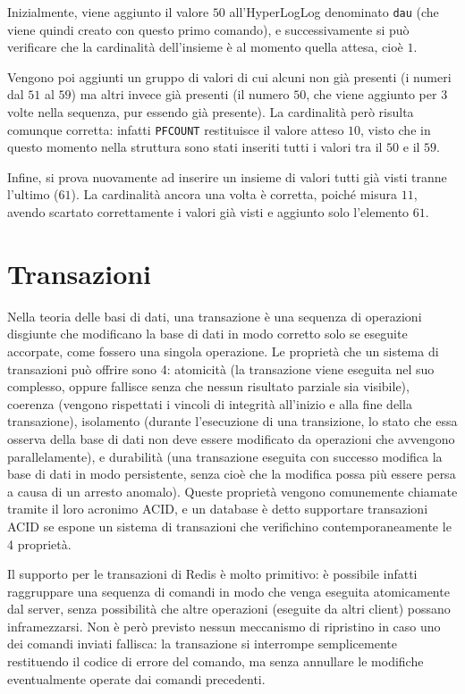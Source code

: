 Inizialmente, viene aggiunto il valore $50$ all'HyperLogLog denominato \verb|dau|  (che
viene quindi creato con questo primo comando), e successivamente si può verificare che la
cardinalità dell'insieme è al momento quella attesa, cioè $1$.

Vengono poi aggiunti un gruppo di valori  di cui alcuni non già presenti (i numeri dal $51$
al $59$) ma altri invece già presenti (il numero $50$, che viene aggiunto per 3 volte nella
sequenza, pur essendo già presente). La cardinalità però risulta comunque corretta: infatti
\verb|PFCOUNT| restituisce il valore atteso $10$, visto che in questo momento nella struttura sono
stati inseriti tutti i valori tra il $50$ e il $59$. 

Infine, si prova nuovamente ad inserire un insieme di valori  tutti già visti tranne
l'ultimo ($61$). La cardinalità ancora una volta è corretta, poiché misura $11$, avendo scartato
correttamente i valori già visti e aggiunto solo l'elemento $61$.

\section{Transazioni}

Nella teoria delle basi di dati, una transazione è una sequenza di operazioni disgiunte che
modificano la base di dati in modo corretto solo se eseguite accorpate, come fossero una singola
operazione. Le proprietà che un sistema di transazioni può offrire sono 4: atomicità (la transazione
viene eseguita nel suo complesso, oppure fallisce senza che nessun risultato parziale sia visibile),
coerenza (vengono rispettati i vincoli di integrità all'inizio e alla fine della transazione),
isolamento (durante l'esecuzione di una transizione, lo stato che essa osserva della base di dati
non deve essere modificato da operazioni che avvengono parallelamente), e durabilità (una
transazione eseguita con successo modifica la base di dati in modo persistente, senza cioè che la
modifica possa più essere persa a causa di un arresto anomalo). Queste proprietà vengono comunemente
chiamate tramite il loro acronimo ACID, e un database è detto supportare transazioni ACID se espone
un sistema di transazioni che verifichino contemporaneamente le 4 proprietà.

Il supporto per le transazioni di Redis è molto primitivo: è possibile infatti raggruppare
una sequenza di comandi in modo che venga eseguita atomicamente dal server, senza possibilità che
altre operazioni (eseguite da altri client) possano inframezzarsi. Non è però previsto nessun
meccanismo di ripristino in caso uno dei comandi inviati fallisca: la transazione si interrompe
semplicemente restituendo il codice di errore del comando, ma senza annullare le modifiche
eventualmente operate dai comandi precedenti.

